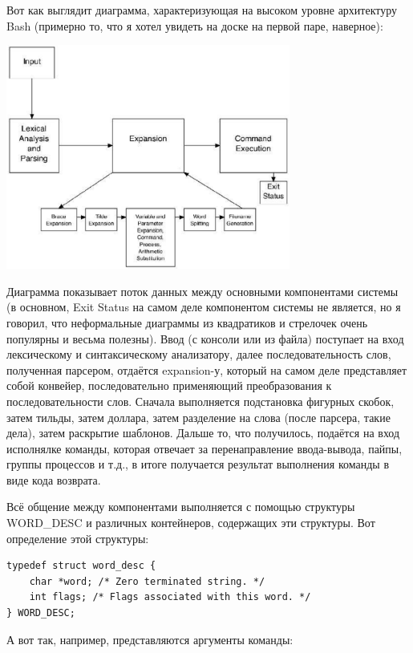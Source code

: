 \documentclass[a5paper]{article}
\begin{document}
Вот как выглядит диаграмма, характеризующая на высоком уровне архитектуру Bash (примерно то, что я хотел увидеть на доске на первой паре, наверное):

\begin{center}
	\includegraphics[width=0.7\textwidth]{bashArchitecture.png}
\end{center}

Диаграмма показывает поток данных между основными компонентами системы (в основном, Exit Status на самом деле компонентом системы не является, но я говорил, что неформальные диаграммы из квадратиков и стрелочек очень популярны и весьма полезны). Ввод (с консоли или из файла) поступает на вход лексическому и синтаксическому анализатору, далее последовательность слов, полученная парсером, отдаётся expansion-у, который на самом деле представляет собой конвейер, последовательно применяющий преобразования к последовательности слов. Сначала выполняется подстановка фигурных скобок, затем тильды, затем доллара, затем разделение на слова (после парсера, такие дела), затем раскрытие шаблонов. Дальше то, что получилось, подаётся на вход исполнялке команды, которая отвечает за перенаправление ввода-вывода, пайпы, группы процессов и т.д., в итоге получается результат выполнения команды в виде кода возврата.

Всё общение между компонентами выполняется с помощью структуры WORD\_DESC и различных контейнеров, содержащих эти структуры. Вот определение этой структуры:

\begin{verbatim}
typedef struct word_desc {
    char *word; /* Zero terminated string. */
    int flags; /* Flags associated with this word. */
} WORD_DESC;
\end{verbatim}

А вот так, например, представляются аргументы команды:
\end{document}
